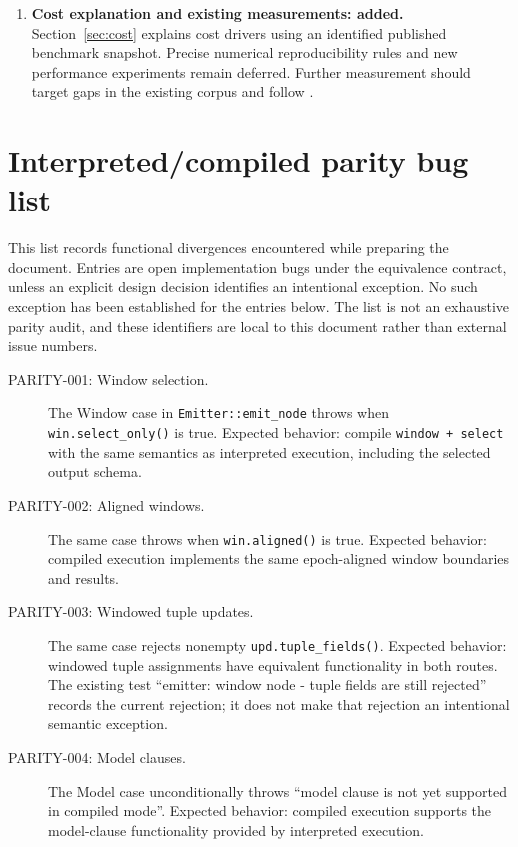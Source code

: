 \documentclass[11pt,a4paper]{article}
\newcommand{\code}[1]{\nolinkurl{#1}}
\newcommand{\src}[1]{\path{#1}}
\begin{document}
\begin{enumerate}
    reader ownership, Arrow adoption, and retained state. Source-specific
    decoder behavior, cross-chunk dictionary compatibility, and measured
    peak memory remain open; a shared interface is insufficient evidence for
    every plugin boundary.
  \item \textbf{Cost explanation and existing measurements: added.}
    Section~\ref{sec:cost} explains cost drivers using an identified published
    benchmark snapshot. Precise numerical reproducibility rules and new
    performance experiments remain deferred. Further measurement should target
    gaps in the existing corpus and follow \src{MEASURING.md}.
\end{enumerate}

\appendix
\section{Interpreted/compiled parity bug list}
\label{sec:backend-bugs}
This list records functional divergences encountered while preparing the
document. Entries are open implementation bugs under the equivalence contract,
unless an explicit design decision identifies an intentional exception.
No such exception has been established for the entries below. The list is
not an exhaustive parity audit, and these identifiers are local to this
document rather than external issue numbers.

\begin{description}
  \item[PARITY-001: Window selection.] The Window case in
    \code{Emitter::emit_node} throws when \code{win.select_only()} is true.
    Expected behavior: compile \code{window + select} with the same semantics
    as interpreted execution, including the selected output schema.
  \item[PARITY-002: Aligned windows.] The same case throws when
    \code{win.aligned()} is true. Expected behavior: compiled execution
    implements the same epoch-aligned window boundaries and results.
  \item[PARITY-003: Windowed tuple updates.] The same case rejects nonempty
    \code{upd.tuple_fields()}. Expected behavior: windowed tuple assignments
    have equivalent functionality in both routes. The existing test
    ``emitter: window node - tuple fields are still rejected'' records the
    current rejection; it does not make that rejection an intentional
    semantic exception.
  \item[PARITY-004: Model clauses.] The Model case unconditionally throws
    ``model clause is not yet supported in compiled mode''. Expected behavior:
    compiled execution supports the model-clause functionality provided by
    interpreted execution.
\end{description}
\end{document}
